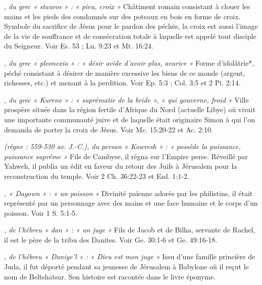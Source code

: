 \begin{multicols}{2}
{\textit{, du grec « stauros » : « pieu, croix »}\newline
Châtiment romain consistant à clouer les mains et les pieds des condamnés sur des poteaux en bois en forme de croix. Symbole du sacrifice de Jésus pour le pardon des péchés, la croix est aussi l'image de la vie de souffrance et de consécration totale à laquelle est appelé tout disciple du Seigneur. Voir Es. 53 ; Lu. 9:23 et Mt. 16:24.

\textit{, du grec « pleonexia » : « désir avide d'avoir plus, avarice »}\newline
Forme d'idolâtrie*, péché consistant à désirer de manière excessive les biens de ce monde (argent, richesses, etc.) et menant à la perdition. Voir Ep. 5:3 ; Col. 3:5 et 2 Pi. 2:14.

\textit{, du grec « Kurene » : « suprématie de la bride », « qui gouverne, froid »}\newline
Ville prospère située dans la région fertile d'Afrique du Nord (actuelle Libye) où vivait une importante communauté juive et de laquelle était originaire Simon à qui l'on demanda de porter la croix de Jésus. Voir Mc. 15:20-22 et Ac. 2:10.

\textit{(règne : 559-530 av. J.-C.), du persan « Kowresh » : « possède la puissance, puissance suprême »}\newline
Fils de Cambyse, il régna sur l'Empire perse. Réveillé par Yahweh, il publia un édit en faveur du retour des Juifs à Jérusalem pour la reconstruction du temple. Voir 2 Ch. 36:22-23 et Esd. 1:1-2.

\textit{, « Dagown » : « un poisson »}\newline
Divinité païenne adorée par les philistins, il était représenté par un personnage avec des mains et une face humaine et le corps d'un poisson. Voir 1 S. 5:1-5.

\textit{, de l'hébreu « dan » : « un juge »}\newline
Fils de Jacob et de Bilha, servante de Rachel, il est le père de la tribu des Danites. Voir Ge. 30:1-6 et Ge. 49:16-18.

\textit{, de l'hébreu « Daniye'l » : « Dieu est mon juge »}\newline
Issu d'une famille princière de Juda, il fut déporté pendant sa jeunesse de Jérusalem à Babylone où il reçut le nom de Beltshatsar. Son histoire est racontée dans le livre éponyme.

}
\end{multicols}
